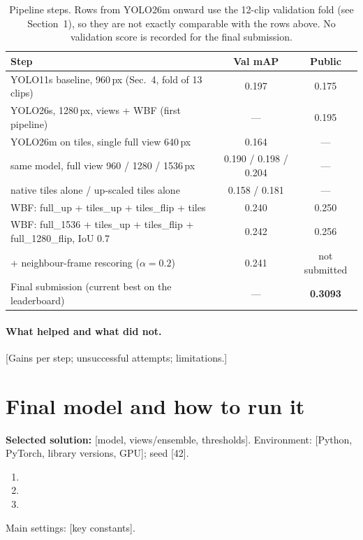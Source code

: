 \documentclass[11pt,a4paper]{article}
\begin{document}
\begin{table}[h]
\centering\footnotesize
\begin{tabular}{lcc}
\toprule
Step & Val mAP & Public \\
\midrule
YOLO11s baseline, 960\,px (Sec.~4, fold of 13 clips) & 0.197 & 0.175 \\
YOLO26s, 1280\,px, views + WBF (first pipeline) & --- & 0.195 \\
\midrule
YOLO26m on tiles, single full view 640\,px & 0.164 & --- \\
\quad same model, full view 960 / 1280 / 1536\,px & 0.190 / 0.198 / 0.204 & --- \\
\quad native tiles alone / up-scaled tiles alone & 0.158 / 0.181 & --- \\
\quad WBF: full\_up + tiles\_up + tiles\_flip + tiles & 0.240 & 0.250 \\
\quad WBF: full\_1536 + tiles\_up + tiles\_flip + full\_1280\_flip, IoU 0.7 & 0.242 & 0.256 \\
\quad + neighbour-frame rescoring ($\alpha=0.2$) & 0.241 & not submitted \\
Final submission (current best on the leaderboard) & --- & \textbf{0.3093} \\
\bottomrule
\end{tabular}
\caption{Pipeline steps. Rows from YOLO26m onward use the 12-clip validation fold (see Section~1), so they are not exactly comparable with the rows above. No validation score is recorded for the final submission.}
\label{tab:pipe}
\end{table}

\paragraph{What helped and what did not.} [Gains per step; unsuccessful attempts; limitations.]

\section{Final model and how to run it}
\textbf{Selected solution:} [model, views/ensemble, thresholds]. Environment: [Python, PyTorch, library versions, GPU]; seed [42].
\begin{enumerate}
\item{}
\item{}
\item{}
\end{enumerate}
Main settings: [key constants].
\end{document}
